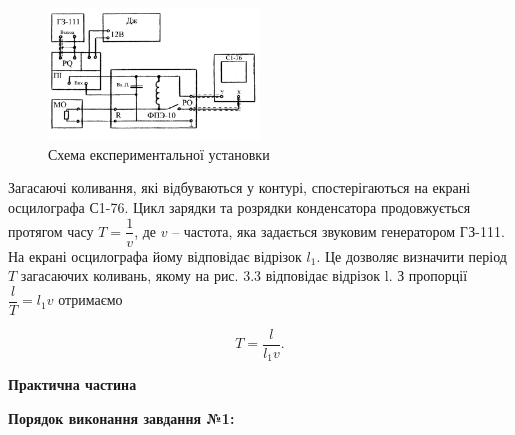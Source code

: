 \documentclass[12pt,a4paper]{article}
\begin{document}
    \begin{figure}[h!]

        \renewcommand{\thefigure}{3.\arabic{figure}} %

        \centering
        \includegraphics[width=0.5\textwidth]{3.5.png}
        \caption{Схема експериментальної установки}
        \label{fig5:schema}

    \end{figure}

    Загасаючі коливання, які відбуваються у контурі, спостерігаються на екрані
    осцилографа С1-76. Цикл зарядки та розрядки конденсатора продовжується
    протягом часу $T = \dfrac{1}{v}$, де $v$ – частота, яка задається звуковим
    генератором ГЗ-111. На екрані осцилографа йому відповідає відрізок $l_1$.
    Це дозволяє визначити період $T$ загасаючих коливань,
    якому на рис. 3.3 відповідає відрізок l. З пропорції $\dfrac{l}{T} = l_1v$ отримаємо

    \begin{equation}
        T = \frac{l}{l_1v}.
        \tag{3.14}
    \end{equation}


    \newpage

    \begin{center}
        \textbf{\Large Практична частина}
    \end{center}

    \vspace{1em} %

    \setlength{\parindent}{0pt}

    \textbf{Порядок виконання завдання №1:}

    \vspace{1em} %
\end{document}
